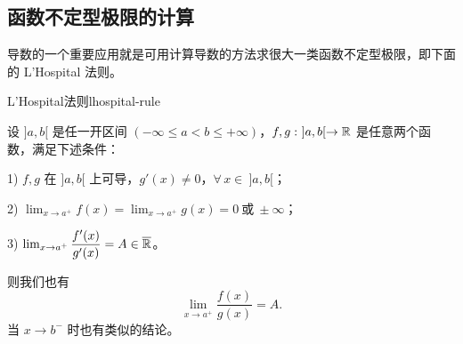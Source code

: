 \subsection{函数不定型极限的计算}

导数的一个重要应用就是可用计算导数的方法求很大一类函数不定型极限，即下面的 L'Hospital 法则。

\begin{mythm}{L'Hospital法则}{lhospital-rule}

	设 \(]a,b[\) 是任一开区间 \((-\infty\le a<b\le+\infty)\)，\(f,g:\ ]a,b[\to\mathbb{R}\) 是任意两个函数，满足下述条件：

	1) \(f,g\) 在 \(]a,b[\) 上可导，\(g'(x)\neq0\)，\(\forall\,x\in\ ]a,b[\)；

	2) \(\lim_{x\to a^+}f(x)=\lim_{x\to a^+}g(x)=0\ \text{或}\ \pm\infty\)；

	3) \(\lim_{x\to a^+}\dfrac{f'(x)}{g'(x)}=A\in\overline{\mathbb{R}}\)。

	则我们也有
	\[
	\lim_{x\to a^+}\frac{f(x)}{g(x)}=A.
	\]
	当 \(x\to b^-\) 时也有类似的结论。

\end{mythm}

